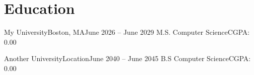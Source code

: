\section{Education}
  \resumeSubHeadingListStart

    \resumeSubheadingEducation
      {My University}{Boston, MA}{June 2026 -- June 2029}
      {M.S. Computer Science}{CGPA: 0.00}

    \resumeSubheadingEducation
      {Another University}{Location}{June 2040 -- June 2045}
      {B.S Computer Science}{CGPA: 0.00}

  \resumeSubHeadingListEnd
